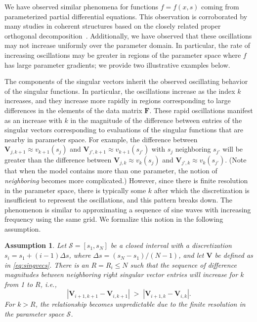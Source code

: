 \documentclass[final]{siamltex}
\providecommand{\mat}[1]{\boldsymbol{#1}}
\providecommand{\mF}{\ensuremath{\mat{F}}}
\providecommand{\mV}{\ensuremath{\mat{V}}}
\newtheorem{assump}{Assumption}
\begin{document}
We have observed similar phenomena for functions $f=f(x,s)$ coming
from parameterized partial differential equations. This observation is
corroborated by many studies in coherent structures based on the
closely related proper orthogonal
decomposition~\cite{lumley2012turbulence}.  Additionally, we have
observed that these oscillations may not increase uniformly over
the parameter domain. In particular, the rate of 
increasing oscillations may be greater in regions of the parameter
space where $f$ has large parameter gradients; we provide two 
illustrative examples below. 

The components of the singular vectors inherit the observed
oscillating behavior of the singular functions. In particular, the
oscillations increase as the index $k$ increases, and they increase
more rapidly in regions corresponding to large differences in the
elements of the data matrix $\mF$.  These rapid oscillations manifest
as an increase with $k$ in the magnitude of the difference between
entries of the singular vectors corresponding to evaluations of the
singular functions that are nearby in parameter space. For example,
the difference between $\mV_{j,k+1}\approx v_{k+1}(s_j)$ and
$\mV_{j',k+1}\approx v_{k+1}(s_{j'})$ with $s_j$ neighboring $s_{j'}$
will be greater than the difference between $\mV_{j,k}\approx
v_{k}(s_j)$ and $\mV_{j',k}\approx v_{k}(s_{j'})$. (Note that when the
model contains more than one parameter, the notion of
\emph{neighboring} becomes more complicated.) However, since there is
finite resolution in the parameter space, there is typically some $k$
after which the discretization is insufficient to represent the
oscillations, and this pattern breaks down.  The phenomenon is similar
to approximating a sequence of sine waves with increasing frequency
using the same grid.
We formalize this notion in the following assumption.
\begin{assump}
\label{bigass}
Let ${\mathcal{S}} = [s_1,s_N]$ be a closed interval with a discretization $s_i
= s_1+(i-1)\Delta s$, where $\Delta s = (s_N-s_1)/(N-1)$, and let
$\mV$ be defined as in \eqref{eq:singvecs}. There is an $R=R_i\leq N$
such that the sequence of difference magnitudes between neighboring
right singular vector entries will increase for $k$ from 1 to $R$,
i.e.,
\begin{equation}
|\mV_{i+1,k+1} - \mV_{i,k+1}| \;>\; |\mV_{i+1,k} - \mV_{i,k}|.
\end{equation}
For $k>R$, the relationship becomes unpredictable due to the finite
resolution in the parameter space ${\mathcal{S}}$.
\end{assump}
\end{document}

